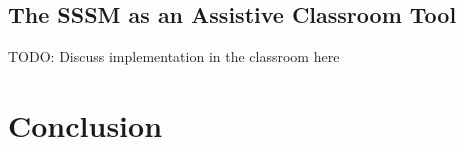 \subsection{The SSSM as an Assistive Classroom Tool}\label{sec:class-assistive}
TODO: Discuss implementation in the classroom here


\section{Conclusion}

